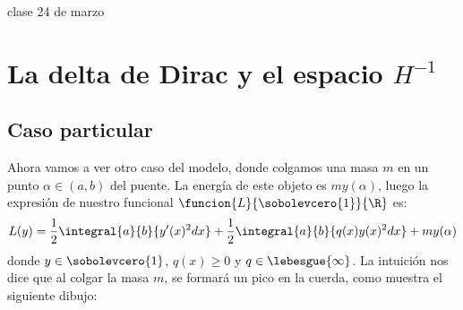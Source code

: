 clase 24 de marzo

\section{La delta de Dirac y el espacio $H^{-1}$}
\subsection{Caso particular}
Ahora vamos a ver otro caso del modelo, donde colgamos una masa $m$ en un punto $\alpha\in(a,b)$ del puente. La energía de este objeto es $my(\alpha)$, luego la expresión de nuestro funcional $\funcion{L}{\sobolevcero{1}}{\R}$ es:
\[
L(y)=\frac{1}{2}\integral{a}{b}{y'(x)^2dx}+\frac{1}{2}\integral{a}{b}{q(x)y(x)^2dx}+my(\alpha)
\]
donde $y\in\sobolevcero{1}$, $q(x)\geq 0$ y  $q\in\lebesgue{\infty}$. La intuición nos dice que al colgar la masa $m$, se formará un pico en la cuerda, como muestra el siguiente dibujo:

